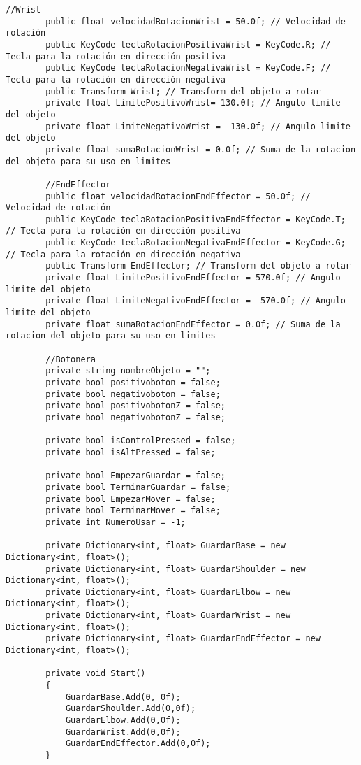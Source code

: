 \begin{lstlisting}[frame=single]
        //Wrist
        public float velocidadRotacionWrist = 50.0f; // Velocidad de rotación
        public KeyCode teclaRotacionPositivaWrist = KeyCode.R; // Tecla para la rotación en dirección positiva
        public KeyCode teclaRotacionNegativaWrist = KeyCode.F; // Tecla para la rotación en dirección negativa
        public Transform Wrist; // Transform del objeto a rotar
        private float LimitePositivoWrist= 130.0f; // Angulo limite del objeto
        private float LimiteNegativoWrist = -130.0f; // Angulo limite del objeto
        private float sumaRotacionWrist = 0.0f; // Suma de la rotacion del objeto para su uso en limites

        //EndEffector
        public float velocidadRotacionEndEffector = 50.0f; // Velocidad de rotación
        public KeyCode teclaRotacionPositivaEndEffector = KeyCode.T; // Tecla para la rotación en dirección positiva
        public KeyCode teclaRotacionNegativaEndEffector = KeyCode.G; // Tecla para la rotación en dirección negativa
        public Transform EndEffector; // Transform del objeto a rotar
        private float LimitePositivoEndEffector = 570.0f; // Angulo limite del objeto
        private float LimiteNegativoEndEffector = -570.0f; // Angulo limite del objeto
        private float sumaRotacionEndEffector = 0.0f; // Suma de la rotacion del objeto para su uso en limites

        //Botonera
        private string nombreObjeto = "";
        private bool positivoboton = false;
        private bool negativoboton = false;
        private bool positivobotonZ = false;
        private bool negativobotonZ = false;

        private bool isControlPressed = false;
        private bool isAltPressed = false;

        private bool EmpezarGuardar = false;
        private bool TerminarGuardar = false;
        private bool EmpezarMover = false;
        private bool TerminarMover = false;
        private int NumeroUsar = -1;

        private Dictionary<int, float> GuardarBase = new Dictionary<int, float>();
        private Dictionary<int, float> GuardarShoulder = new Dictionary<int, float>();
        private Dictionary<int, float> GuardarElbow = new Dictionary<int, float>();
        private Dictionary<int, float> GuardarWrist = new Dictionary<int, float>();
        private Dictionary<int, float> GuardarEndEffector = new Dictionary<int, float>();

        private void Start()
        {
            GuardarBase.Add(0, 0f);
            GuardarShoulder.Add(0,0f);
            GuardarElbow.Add(0,0f);
            GuardarWrist.Add(0,0f);
            GuardarEndEffector.Add(0,0f);
        }


\end{lstlisting}
